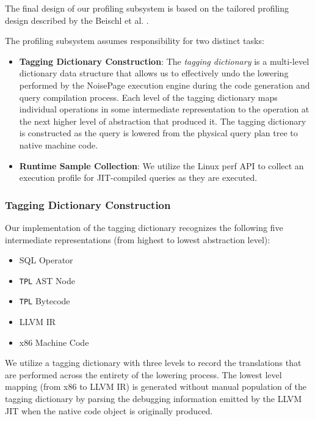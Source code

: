 \documentclass{vldb}
\newcommand{\tpl}{\texttt{TPL}\xspace}
\begin{document}
The final design of our profiling subsystem is based on the tailored profiling design described by the Beischl et al. \cite{beischl21}.

The profiling subsystem assumes responsibility for two distinct tasks:

\begin{itemize}
    \item \textbf{Tagging Dictionary Construction}: The \textit{tagging dictionary} is a multi-level dictionary data structure that allows us to effectively undo the lowering performed by the NoisePage execution engine during the code generation and query compilation process. Each level of the tagging dictionary maps individual operations in some intermediate representation to the operation at the next higher level of abstraction that produced it. The tagging dictionary is constructed as the query is lowered from the physical query plan tree to native machine code.
    \item \textbf{Runtime Sample Collection}: We utilize the Linux perf API \cite{perf} to collect an execution profile for JIT-compiled queries as they are executed. 
\end{itemize}

\subsubsection{Tagging Dictionary Construction}

Our implementation of the tagging dictionary recognizes the following five intermediate representations (from highest to lowest abstraction level):
\begin{itemize}
    \item SQL Operator
    \item \tpl AST Node
    \item \tpl Bytecode
    \item LLVM IR
    \item x86 Machine Code
\end{itemize}

We utilize a tagging dictionary with three levels to record the translations that are performed across the entirety of the lowering process. The lowest level mapping (from x86 to LLVM IR) is generated without manual population of the tagging dictionary by parsing the debugging information emitted by the LLVM JIT when the native code object is originally produced. 
\end{document}
